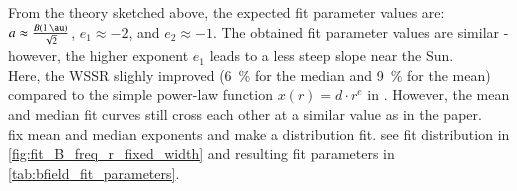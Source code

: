%

From the theory sketched above, the expected fit parameter values are: $a \approx \frac{B(\SI{1}{\au})}{\sqrt{2}}$, $e_1 \approx -2$, and $e_2 \approx -1$. The obtained fit parameter values are similar - however, the higher exponent $e_1$ leads to a less steep slope near the Sun.\\

Here, the WSSR slighly improved (\SI{6}{\%} for the median and \SI{9}{\%} for the mean) compared to the simple power-law function $x(r) = d \cdot r^e$ in \citet{Venzmer2017}. However, the mean and median fit curves still cross each other at a similar value as in the paper.\\




fix mean and median exponents and make a distribution fit. see fit distribution in \autoref{fig:fit_B_freq_r_fixed_width} and resulting fit parameters in \autoref{tab:bfield_fit_parameters}.\\
\begin{figure}[htb]
\end{figure}

